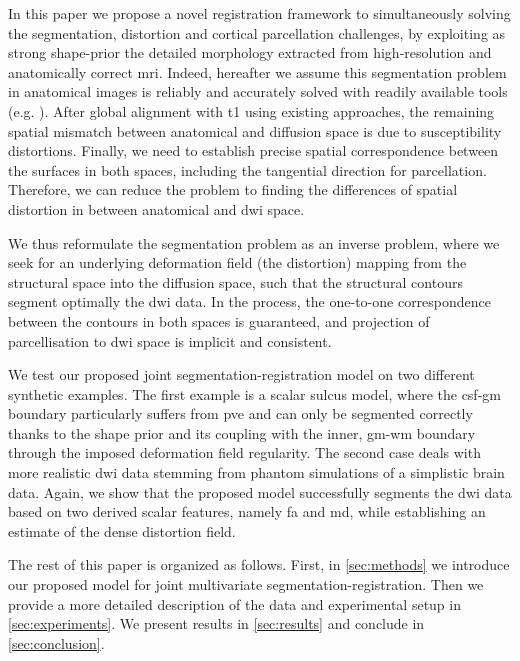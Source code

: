 In this paper we propose a novel registration framework to simultaneously
solving the segmentation, distortion and cortical parcellation challenges, 
by exploiting as strong shape-prior the detailed morphology extracted 
from high-resolution and anatomically correct \gls{mri}. Indeed, hereafter 
we assume this segmentation problem in anatomical images is reliably and
accurately solved with readily available tools (e.g. \citep{fischl_freesurfer_2012}).
After global alignment with \gls{t1} using existing approaches, the remaining 
spatial mismatch between anatomical and diffusion space is due to susceptibility
distortions.
Finally, we need to establish precise spatial correspondence between the 
surfaces in both spaces, including the tangential direction for parcellation.
Therefore, we can reduce the problem to finding the differences of spatial 
distortion in between anatomical and \gls{dwi} space.
{\color{red} {We thus reformulate the segmentation problem as an inverse problem, where we 
seek for an underlying deformation field (the distortion) mapping 
from the structural space into the diffusion space, such that the structural 
contours segment optimally the \gls{dwi} data. In the process, the one-to-one 
correspondence between the contours in both spaces is guaranteed, and projection 
of parcellisation to \gls{dwi} space is implicit and consistent.

We test our proposed joint segmentation-registration model on two different 
synthetic examples. The first example is a scalar sulcus model, where the 
\gls{csf}-\gls{gm} boundary particularly suffers from \gls{pve} and can only be 
segmented correctly thanks to the shape prior and its coupling with the inner, 
\gls{gm}-\gls{wm} boundary through the imposed deformation field regularity. 
The second case deals with more realistic \gls{dwi} data stemming from 
phantom simulations of a simplistic brain data. Again, we show that the 
proposed model successfully segments the \gls{dwi} data based on two derived 
scalar features, namely \gls{fa} and \gls{md}, while establishing an estimate 
of the dense distortion field.

The rest of this paper is organized as follows. First, in \autoref{sec:methods}
we introduce our proposed model for joint multivariate segmentation-registration.
Then we provide a more detailed description of the data and experimental setup in
\autoref{sec:experiments}. We present results in \autoref{sec:results} and conclude 
in \autoref{sec:conclusion}.}}